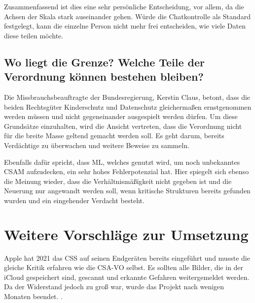 Zusammenfassend ist dies eine sehr persönliche Entscheidung, vor allem, da die Achsen der Skala stark auseinander gehen. Würde die Chatkontrolle als Standard festgelegt, kann die einzelne Person nicht mehr frei entscheiden, wie viele Daten diese teilen möchte.

\section*{Wo liegt die Grenze? Welche Teile der Verordnung können bestehen bleiben?}

Die Missbrauchsbeauftragte der Bundesregierung, Kerstin Claus, betont, dass die beiden Rechtsgüter Kinderschutz und Datenschutz \glqq gleichermaßen ernstgenommen\grqq{} werden müssen und \glqq nicht gegeneinander ausgespielt\grqq{} \cite{claus:2023} werden dürfen.
Um diese Grundsätze einzuhalten, wird die Ansicht vertreten, dass die Verordnung nicht für die breite Masse geltend gemacht werden soll. Es geht darum, bereits Verdächtige zu überwachen und weitere Beweise zu sammeln.

Ebenfalls dafür spricht, dass \ac{ML}, welches genutzt wird, um noch unbekanntes \ac{CSAM} aufzudecken, ein sehr hohes Fehlerpotenzial hat. Hier spiegelt sich ebenso die Meinung wieder, dass die Verhältnismäßigkeit nicht gegeben ist und die Neuerung nur angewandt werden soll, wenn kritische Strukturen bereits gefunden wurden und ein eingehender Verdacht besteht.



\chapter{Weitere Vorschläge zur Umsetzung}
\label{sec:Diskussion:weitereVorschläge}

Apple hat 2021 das \ac{CSS} auf seinen Endgeräten bereits eingeführt und musste die gleiche Kritik erfahren wie die \ac{CSA-VO} selbst. Es sollten alle Bilder, die in der iCloud gespeichert sind, gescannt und erkannte Gefahren weitergemeldet werden. Da der Widerstand jedoch zu groß war, wurde das Projekt nach wenigen Monaten beendet. \cite{rosenzweig:2021:apple, wilson:2023:fhe}.

